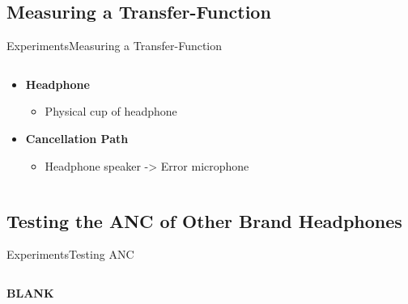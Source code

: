 \subsection{Measuring a Transfer-Function}

\begin{frame}{Experiments}{Measuring a Transfer-Function}		
	\begin{columns}
		\begin{column}{0.7\textwidth}
			\begin{itemize}
				\item[] \textbf{Headphone}
					\begin{itemize}
						\item Physical cup of headphone
					\end{itemize}
				\item[] \textbf{Cancellation Path}
					\begin{itemize}
						\item Headphone speaker -> Error microphone
					\end{itemize}
			\end{itemize}
		\end{column}
		\begin{column}{0.3\textwidth} 
		\end{column}
	\end{columns}
\end{frame}




\subsection{Testing the ANC of Other Brand Headphones}
\begin{frame}{Experiments}{Testing ANC}		
	\begin{columns}
		\begin{column}{0.5\textwidth}
			\textbf{BLANK}
		\end{column}
		\begin{column}{0.5\textwidth} 
		\end{column}
	\end{columns}
\end{frame}










